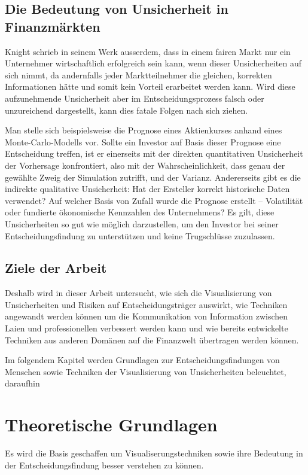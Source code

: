 \subsection{Die Bedeutung von Unsicherheit in Finanzmärkten}
Knight schrieb in seinem Werk ausserdem, dass in einem fairen Markt nur ein Unternehmer wirtschaftlich erfolgreich
sein kann, wenn dieser Unsicherheiten auf sich nimmt, da andernfalls jeder Marktteilnehmer die gleichen, korrekten 
Informationen hätte und somit kein Vorteil erarbeitet werden kann.
Wird diese aufzunehmende Unsicherheit aber im Entscheidungsprozess falsch oder unzureichend dargestellt, kann dies fatale Folgen nach sich 
ziehen. 

Man stelle sich beispielsweise die Prognose eines Aktienkurses anhand eines Monte-Carlo-Modells vor. Sollte ein Investor auf Basis 
dieser Prognose eine Entscheidung treffen, ist er einerseits mit der direkten quantitativen Unsicherheit der Vorhersage konfrontiert, 
also mit der Wahrscheinlichkeit, dass genau der gewählte Zweig der Simulation zutrifft, und der Varianz. Andererseits gibt es die 
indirekte qualitative Unsicherheit: Hat der Ersteller korrekt historische Daten verwendet? \cite{Padilla2021} Auf welcher Basis von Zufall wurde die Prognose erstellt –
 Volatilität oder fundierte ökonomische Kennzahlen des Unternehmens? Es gilt, diese Unsicherheiten so gut wie möglich darzustellen, 
 um den Investor bei seiner Entscheidungsfindung zu unterstützen und keine Trugschlüsse zuzulassen.

\subsection{Ziele der Arbeit}
Deshalb wird in dieser Arbeit untersucht, wie sich die Visualisierung von Unsicherheiten und Risiken auf Entscheidungsträger auswirkt, wie Techniken angewandt werden können um 
die Kommunikation von Information zwischen Laien und professionellen verbessert werden kann und wie bereits entwickelte Techniken aus anderen Domänen auf die Finanzwelt übertragen werden können.

Im folgendem Kapitel werden Grundlagen zur Entscheidungsfindungen von Menschen sowie Techniken der Visualisierung von Unsicherheiten beleuchtet,
daraufhin


\section{Theoretische Grundlagen}
Es wird die Basis geschaffen um Visualiserungstechniken sowie ihre Bedeutung in der Entscheidungsfindung besser verstehen zu können.

